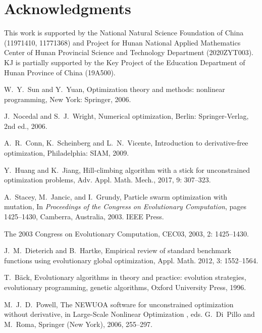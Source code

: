 \documentclass[mathpazo]{csam}
\theoremstyle{remark}
\begin{document}
\section*{Acknowledgments}
This work is supported by the National Natural Science Foundation of China (11971410,
11771368) and Project for Hunan National Applied Mathematics Center of Hunan
Provincial Science and Technology Department (2020ZYT003).
KJ is partially supported by the Key Project of the Education Department of 
Hunan Province of China (19A500). 


\begin{thebibliography}{99}

W.~Y.~Sun and Y.~Yuan,
Optimization theory and methods: nonlinear programming,
New York: Springer, 2006.


J.~Nocedal and S.~J.~Wright,
Numerical optimization, 
Berlin: Springer-Verlag, 2nd ed., 2006.

A.~R.~Conn, K.~Scheinberg and L.~N.~Vicente,
Introduction to derivative-free optimization,
Philadelphia: SIAM, 2009.

{Y.~Huang and K.~Jiang,}
{Hill-climbing algorithm with a stick for unconstrained optimization problems},
{Adv. Appl. Math. Mech.},
2017, 9: 307--323.

  {A.~Stacey, M.~Jancic, and I.~Grundy},
  {Particle swarm optimization with mutation},
  In \textit{Proceedings of the Congress on Evolutionary Computation}, pages
1425–1430, Camberra, Australia, 2003. IEEE Press.


  {The 2003 Congress on Evolutionary Computation, CEC03},
  2003, 2: 1425--1430.

J.~M.~Dieterich and B.~Hartke, 
Empirical review of standard benchmark functions using evolutionary global optimization,
{Appl. Math.} 2012, 3: 1552--1564.

T.~B{\"a}ck, 
Evolutionary algorithms in theory and practice: evolution
  strategies, evolutionary programming, genetic algorithms,
Oxford University Press, 1996.

M.~J.~D.~Powell,
The NEWUOA software for unconstrained optimization without derivative, in
Large-Scale Nonlinear Optimization , eds. G.~Di~Pillo
and M.~Roma, Springer (New York), 2006, 255--297.


\end{thebibliography}
\end{document}

